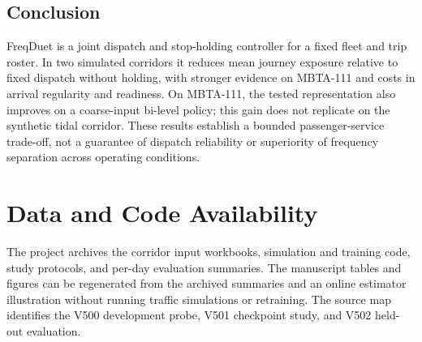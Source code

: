 \subsection{Conclusion}
FreqDuet is a joint dispatch and stop-holding controller for a fixed fleet and trip roster. In two simulated corridors it reduces mean journey exposure relative to fixed dispatch without holding, with stronger evidence on MBTA-111 and costs in arrival regularity and readiness. On MBTA-111, the tested representation also improves on a coarse-input bi-level policy; this gain does not replicate on the synthetic tidal corridor. These results establish a bounded passenger-service trade-off, not a guarantee of dispatch reliability or superiority of frequency separation across operating conditions.

\section*{Data and Code Availability}
The project archives the corridor input workbooks, simulation and training code, study protocols, and per-day evaluation summaries. The manuscript tables and figures can be regenerated from the archived summaries and an online estimator illustration without running traffic simulations or retraining. The source map identifies the V500 development probe, V501 checkpoint study, and V502 held-out evaluation.
